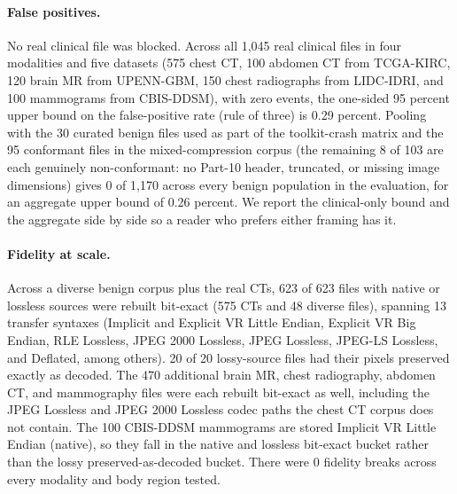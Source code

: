 \documentclass[11pt]{article}
\begin{document}
\paragraph{False positives.} No real clinical file was blocked. Across all 1,045 real clinical files in four modalities and five datasets (575 chest CT, 100 abdomen CT from TCGA-KIRC, 120 brain MR from UPENN-GBM, 150 chest radiographs from LIDC-IDRI, and 100 mammograms from CBIS-DDSM), with zero events, the one-sided 95 percent upper bound on the false-positive rate (rule of three) is 0.29 percent. Pooling with the 30 curated benign files used as part of the toolkit-crash matrix and the 95 conformant files in the mixed-compression corpus (the remaining 8 of 103 are each genuinely non-conformant: no Part-10 header, truncated, or missing image dimensions) gives 0 of 1,170 across every benign population in the evaluation, for an aggregate upper bound of 0.26 percent. We report the clinical-only bound and the aggregate side by side so a reader who prefers either framing has it.

\paragraph{Fidelity at scale.} Across a diverse benign corpus plus the real CTs, 623 of 623 files with native or lossless sources were rebuilt bit-exact (575 CTs and 48 diverse files), spanning 13 transfer syntaxes (Implicit and Explicit VR Little Endian, Explicit VR Big Endian, RLE Lossless, JPEG 2000 Lossless, JPEG Lossless, JPEG-LS Lossless, and Deflated, among others). 20 of 20 lossy-source files had their pixels preserved exactly as decoded. The 470 additional brain MR, chest radiography, abdomen CT, and mammography files were each rebuilt bit-exact as well, including the JPEG Lossless and JPEG 2000 Lossless codec paths the chest CT corpus does not contain. The 100 CBIS-DDSM mammograms are stored Implicit VR Little Endian (native), so they fall in the native and lossless bit-exact bucket rather than the lossy preserved-as-decoded bucket. There were 0 fidelity breaks across every modality and body region tested.
\end{document}
